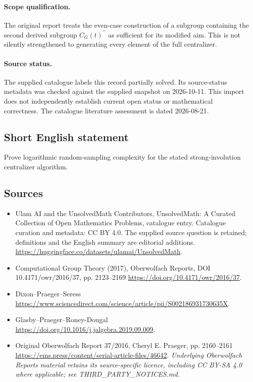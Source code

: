 \documentclass[11pt]{article}
\begin{document}
\paragraph{Scope qualification.}
The original report treats the even-case construction of a subgroup containing the second derived subgroup $C_G(t)^{\prime\prime}$ as sufficient for its modified aim. This is not silently strengthened to generating every element of the full centralizer.
\paragraph{Source status.}
The supplied catalogue labels this record partially solved. Its source-status metadata was checked against the supplied snapshot on 2026-10-11. This import does not independently establish current open status or mathematical correctness. The catalogue literature assessment is dated 2026-08-21.
\subsection{Short English statement}
Prove logarithmic random-sampling complexity for the stated strong-involution centralizer algorithm.
\subsection{Sources}
\begin{itemize}
\item[S1] Ulam AI and the UnsolvedMath Contributors, UnsolvedMath: A Curated Collection of Open Mathematics Problems, catalogue entry. Catalogue curation and metadata: CC BY 4.0. The supplied source question is retained; definitions and the English summary are editorial additions.
\url{https://huggingface.co/datasets/ulamai/UnsolvedMath}.
\item[S2] Computational Group Theory (2017), Oberwolfach Reports, DOI 10.4171/owr/2016/37, pp. 2123--2169
\url{https://doi.org/10.4171/owr/2016/37}.
\item[S3] Dixon--Praeger--Seress
\url{https://www.sciencedirect.com/science/article/pii/S002186931730635X}.
\item[S4] Glasby--Praeger--Roney-Dougal
\url{https://doi.org/10.1016/j.jalgebra.2019.09.009}.
\item[S5] Original Oberwolfach Report 37/2016, Cheryl E. Praeger, pp. 2160--2161
\url{https://ems.press/content/serial-article-files/46642}.
\textit{Underlying Oberwolfach Reports material retains its source-specific licence, including CC BY-SA 4.0 where applicable; see THIRD\_PARTY\_NOTICES.md.}
\end{itemize}
\end{document}

